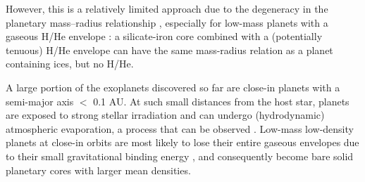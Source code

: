 \documentclass[]{emulateapj}
\begin{document}
However, this is a relatively limited approach due to the degeneracy in the planetary mass--radius relationship \citep{Seager2007,Valencia2010}, especially for low-mass planets with a gaseous H/He envelope \citep{Rogers2010GJ1214b,Valencia2013,Howe2014}: a silicate-iron core combined with a (potentially tenuous) H/He envelope can have the same mass-radius relation as a planet containing ices, but no H/He. 

A large portion of the exoplanets discovered so far are close-in planets  with a semi-major axis $<$ 0.1 AU. At such small distances from the host star, planets are exposed to  strong stellar irradiation and can undergo (hydrodynamic) atmospheric evaporation, a process tha{t} can be observed \citep{Vidal-Madjar2003,Ehrenreich2015}. Low-mass low-density planets at close-in orbits are most likely to lose their entire gaseous envelopes due to their small gravitational binding energy \citep[e.g.,][]{Lammer2009,Lopez2012,Owen2012,Jin2014}, and consequently become bare solid planetary cores with larger mean densities. 
\end{document}
